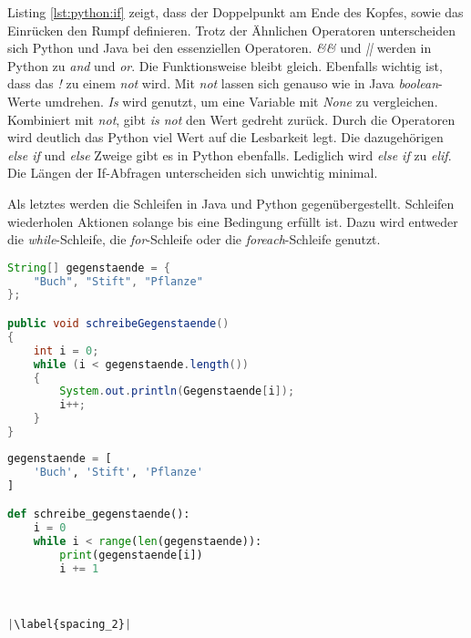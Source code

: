 Listing \ref{lst:python:if} zeigt, dass der Doppelpunkt am Ende des Kopfes, sowie das Einrücken den Rumpf definieren.
Trotz der Ähnlichen Operatoren unterscheiden sich Python und Java bei den essenziellen Operatoren. \textit{\&\&} und \textit{||} werden in Python zu \textit{and} und \textit{or}. Die Funktionsweise bleibt gleich. Ebenfalls wichtig ist, dass das \textit{!} zu einem \textit{not} wird. Mit \textit{not} lassen sich genauso wie in Java \textit{boolean}-Werte umdrehen. \textit{Is} wird genutzt, um eine Variable mit \textit{None} zu vergleichen. Kombiniert mit \textit{not}, gibt \textit{is not} den Wert gedreht zurück. Durch die Operatoren wird deutlich das Python viel Wert auf die Lesbarkeit legt.
Die dazugehörigen \textit{else if} und \textit{else} Zweige gibt es in Python ebenfalls. Lediglich wird \textit{else if} zu \textit{elif}.  Die Längen der If-Abfragen unterscheiden sich unwichtig minimal.\cite{Python3:Buch}\cite{Louis:2010}\par
Als letztes werden die Schleifen in Java und Python gegenübergestellt. Schleifen wiederholen Aktionen solange bis eine Bedingung erfüllt ist. Dazu wird entweder die \textit{while}-Schleife, die \textit{for}-Schleife oder die \textit{foreach}-Schleife genutzt.

\begin{minipage}{.5\linewidth}
\begin{lstlisting}[language=java,caption={while-Schleife Java},captionpos=b,label={lst:java:while},frame=none]
String[] gegenstaende = {
    "Buch", "Stift", "Pflanze"
};

public void schreibeGegenstaende()
{
    int i = 0;
    while (i < gegenstaende.length())
    {
        System.out.println(Gegenstaende[i]);
        i++;
    }
}
\end{lstlisting}
\end{minipage}
\begin{minipage}{.5\linewidth}
\begin{lstlisting}[language=python,caption={while-Schleife Python},captionpos=b,label={lst:python:while},frame=l,escapechar=|]
gegenstaende = [
    'Buch', 'Stift', 'Pflanze'
]

def schreibe_gegenstaende():
    i = 0
    while i < range(len(gegenstaende)):
        print(gegenstaende[i])
        i += 1
        
        

|\label{spacing_2}|
\end{lstlisting}
\end{minipage}

